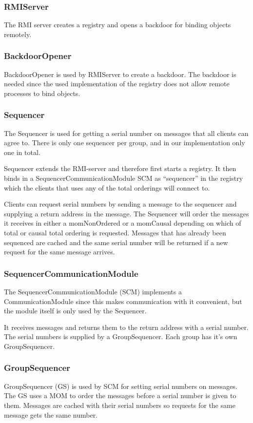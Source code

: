 \documentclass[a4paper,english]{article}
\begin{document}
\subsubsection{RMIServer}
The RMI server creates a registry and opens a backdoor for binding objects remotely.

\subsubsection{BackdoorOpener}
BackdoorOpener is used by RMIServer to create a backdoor. The backdoor is needed since the used implementation of the registry does not allow remote processes to bind objects.

\subsubsection{Sequencer}
The Sequencer is used for getting a serial number on messages that all clients can agree to. There is only one sequencer per group, and in our implementation only one in total.

Sequencer extends the RMI-server and therefore first starts a registry. It then binds in a SequencerCommunicationModule SCM as ``sequencer'' in the registry which the clients that uses any of the total orderings will connect to. 

Clients can request serial numbers by sending a message to the sequencer and supplying a return address in the message. The Sequencer will order the messages it receives in either a momNonOrdered or a momCausal depending on which of total or causal total ordering is requested. Messages that has already been sequenced are cached and the same serial number will be returned if a new request for the same message arrives.

\subsubsection{SequencerCommunicationModule}
The SequencerCommunicationModule (SCM) implements a CommunicationModule since this makes communication with it convenient, but the module itself is only used by the Sequencer. 

It receives messages and returns them to the return address with a serial number. The serial numbers is supplied by a GroupSequencer. Each group has it's own GroupSequencer.

\subsubsection{GroupSequencer}
GroupSequencer (GS) is used by SCM for setting serial numbers on messages. The GS uses a MOM to order the messages before a serial number is given to them. Messages are cached with their serial numbers so requests for the same message gets the same number. 
\end{document}
